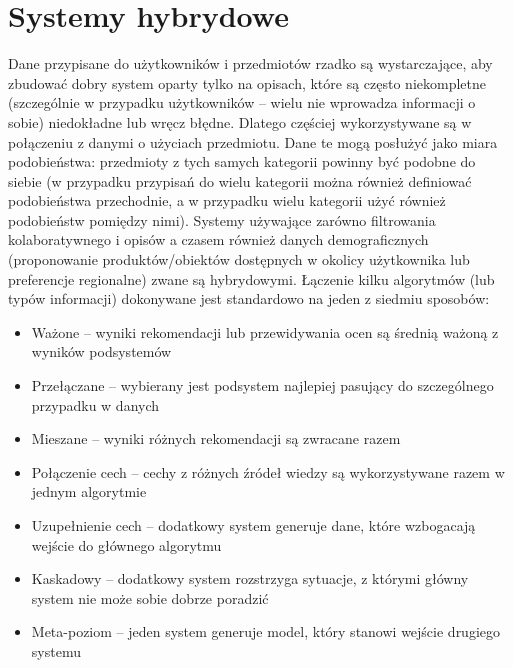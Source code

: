 \documentclass{pracamgr}
\begin{document}
  \section{Systemy hybrydowe}
   Dane przypisane do użytkowników i przedmiotów rzadko są wystarczające, aby zbudować dobry system oparty tylko na opisach,
   które są często niekompletne (szczególnie w przypadku użytkowników -- wielu nie wprowadza informacji o sobie) niedokładne lub wręcz błędne.
   Dlatego częściej wykorzystywane są w połączeniu z danymi o użyciach przedmiotu. Dane te mogą posłużyć jako miara podobieństwa:
   przedmioty z tych samych kategorii powinny być podobne do siebie
   (w przypadku przypisań do wielu kategorii można również definiować podobieństwa przechodnie,
   a w przypadku wielu kategorii użyć również podobieństw pomiędzy nimi).
   Systemy używające zarówno filtrowania kolaboratywnego i opisów a czasem również danych demograficznych
   (proponowanie produktów/obiektów dostępnych w okolicy użytkownika lub preferencje regionalne) zwane są hybrydowymi.
   Łączenie kilku algorytmów (lub typów informacji) dokonywane jest standardowo na jeden z siedmiu sposobów:
   \begin{itemize}\itemsep1pt \parskip0pt 
    \item Ważone -- wyniki rekomendacji lub przewidywania ocen są średnią ważoną z wyników podsystemów
    \item Przełączane -- wybierany jest podsystem najlepiej pasujący do szczególnego przypadku w danych
    \item Mieszane -- wyniki różnych rekomendacji są zwracane razem
    \item Połączenie cech -- cechy z różnych źródeł wiedzy są wykorzystywane razem w jednym algorytmie
    \item Uzupełnienie cech -- dodatkowy system generuje dane, które wzbogacają wejście do głównego algorytmu
    \item Kaskadowy -- dodatkowy system rozstrzyga sytuacje, z którymi główny system nie może sobie dobrze poradzić
    \item Meta-poziom -- jeden system generuje model, który stanowi wejście drugiego systemu
   \end{itemize}
\end{document}
